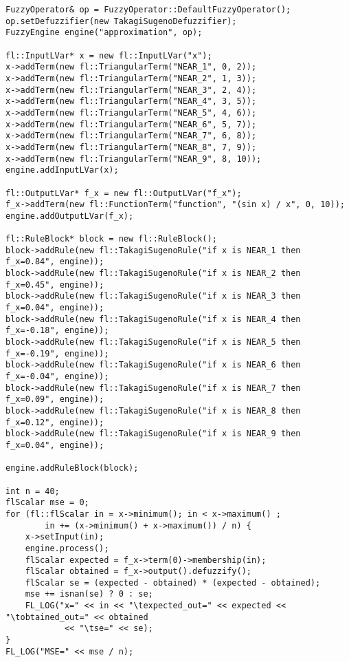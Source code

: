 	
	\begin{lstlisting}[firstnumber=1,tabsize=2]
FuzzyOperator& op = FuzzyOperator::DefaultFuzzyOperator();
op.setDefuzzifier(new TakagiSugenoDefuzzifier);
FuzzyEngine engine("approximation", op);

fl::InputLVar* x = new fl::InputLVar("x");
x->addTerm(new fl::TriangularTerm("NEAR_1", 0, 2));
x->addTerm(new fl::TriangularTerm("NEAR_2", 1, 3));
x->addTerm(new fl::TriangularTerm("NEAR_3", 2, 4));
x->addTerm(new fl::TriangularTerm("NEAR_4", 3, 5));
x->addTerm(new fl::TriangularTerm("NEAR_5", 4, 6));
x->addTerm(new fl::TriangularTerm("NEAR_6", 5, 7));
x->addTerm(new fl::TriangularTerm("NEAR_7", 6, 8));
x->addTerm(new fl::TriangularTerm("NEAR_8", 7, 9));
x->addTerm(new fl::TriangularTerm("NEAR_9", 8, 10));
engine.addInputLVar(x);

fl::OutputLVar* f_x = new fl::OutputLVar("f_x");
f_x->addTerm(new fl::FunctionTerm("function", "(sin x) / x", 0, 10));
engine.addOutputLVar(f_x);

fl::RuleBlock* block = new fl::RuleBlock();
block->addRule(new fl::TakagiSugenoRule("if x is NEAR_1 then f_x=0.84", engine));
block->addRule(new fl::TakagiSugenoRule("if x is NEAR_2 then f_x=0.45", engine));
block->addRule(new fl::TakagiSugenoRule("if x is NEAR_3 then f_x=0.04", engine));
block->addRule(new fl::TakagiSugenoRule("if x is NEAR_4 then f_x=-0.18", engine));
block->addRule(new fl::TakagiSugenoRule("if x is NEAR_5 then f_x=-0.19", engine));
block->addRule(new fl::TakagiSugenoRule("if x is NEAR_6 then f_x=-0.04", engine));
block->addRule(new fl::TakagiSugenoRule("if x is NEAR_7 then f_x=0.09", engine));
block->addRule(new fl::TakagiSugenoRule("if x is NEAR_8 then f_x=0.12", engine));
block->addRule(new fl::TakagiSugenoRule("if x is NEAR_9 then f_x=0.04", engine));

engine.addRuleBlock(block);

int n = 40;
flScalar mse = 0;
for (fl::flScalar in = x->minimum(); in < x->maximum() ;
        in += (x->minimum() + x->maximum()) / n) {
    x->setInput(in);
    engine.process();
    flScalar expected = f_x->term(0)->membership(in);
    flScalar obtained = f_x->output().defuzzify();
    flScalar se = (expected - obtained) * (expected - obtained);
    mse += isnan(se) ? 0 : se;
    FL_LOG("x=" << in << "\texpected_out=" << expected << "\tobtained_out=" << obtained
            << "\tse=" << se);
}
FL_LOG("MSE=" << mse / n);
	\end{lstlisting} 
	
